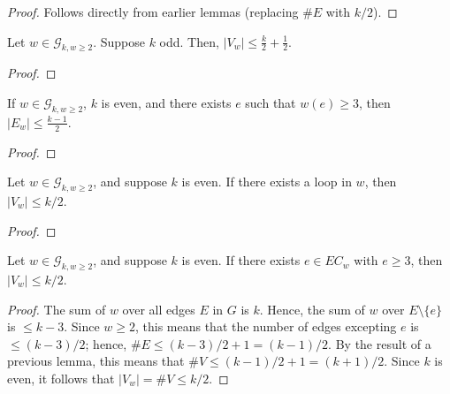 \begin{proof}
  Follows directly from earlier lemmas (replacing $\#E$ with $k/2$).
\end{proof}


\begin{lemma}
  \label{lem:odd_vertex_bound}
  Let $w \in \mathcal{G}_{k,w \geq 2}$.
  Suppose $k$ odd. Then, $|V_w| \le \frac{k}{2} + \frac{1}{2}$.
\end{lemma}

\begin{proof}
\end{proof}


\begin{lemma}
  \label{lem:edge_bound_large_w}
  If $w \in \mathcal{G}_{k,w \geq 2}$, $k$ is even, and there exists $e$ such that $w(e) \ge 3$,
  then $|E_w| \le \frac{k-1}{2}$.
\end{lemma}

\begin{proof}
\end{proof}


\begin{proposition}%
  \label{prop:g_bound_self_edge}
  Let $w\in\mathcal{G}_{k,w \geq 2}$, and suppose $k$ is even. If there exists a loop in $w$,
  then $|V_w|\le k/2$.
\end{proposition}

\begin{proof}

\end{proof}


\begin{proposition}%
  \label{prop:g_bound_large_w}
  Let $w \in\mathcal{G}_{k,w \geq 2}$, and suppose $k$ is even. If there exists $e\in EC_w$
  with $e \ge 3$, then $|V_w|\le k/2$.
\end{proposition}

\begin{proof}
  The sum of $w$ over all edges $E$ in $G$ is $k$.  Hence, the sum of $w$ over $E\setminus\{e\}$ is $\le k-3$.
  Since $w\ge 2$, this means that the number of edges excepting $e$ is $\le (k-3)/2$; hence, $\#E \le (k-3)/2+1 = (k-1)/2$.
  By the result of a previous lemma, this means that $\#V \le (k-1)/2+1 = (k+1)/2$.
  Since $k$ is even, it follows that $|V_w|=\#V \le k/2$.
\end{proof}



